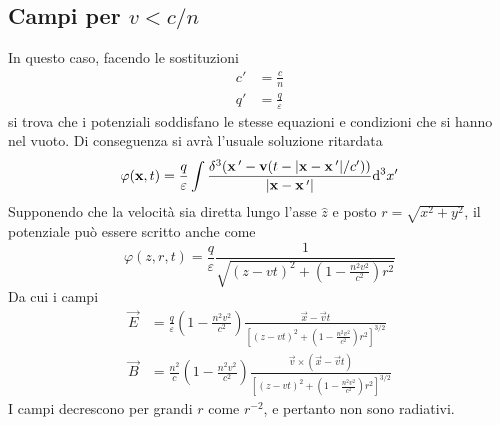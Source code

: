 \documentclass{article}
\begin{document}
	\subsection{Campi per $v<c/n$}
	In questo caso, facendo le sostituzioni
	\begin{align*}
		c'&=\frac{c}{n}\\q'&=\frac{q}{\varepsilon}
	\end{align*}
	si trova che i potenziali soddisfano le stesse equazioni e condizioni che si hanno nel vuoto. Di conseguenza si avrà l'usuale soluzione ritardata
	\[\varphi(\mathbf{x},t)=\frac{q}{\varepsilon}\int\frac{\delta^3(\mathbf{x}\,'-\mathbf{v}(t-|\mathbf{x}-\mathbf{x}\,'|/c'))}{|\mathbf{x}-\mathbf{x}\,'|}\mathrm{d} ^3x'\]
	Supponendo che la velocità sia diretta lungo l'asse $\hat{z}$ e posto $r=\sqrt{x^2+y^2}$, il potenziale può essere scritto anche come
	\[\varphi(z,r,t)=\frac{q}{\varepsilon}\frac{1}{\sqrt{(z-vt)^2+\left(1-\frac{n^2v^2}{c^2}\right)r^2}}\]
	Da cui i campi
	\begin{align*}
		\vec{E}&=\frac{q}{\varepsilon}\left(1-\frac{n^2v^2}{c^2}\right)\frac{\vec{x}-\vec{v}t}{\left[(z-vt)^2+\left(1-\frac{n^2v^2}{c^2}\right)r^2\right]^{3/2}}\\
		\vec{B}&=\frac{n^2}{c}\left(1-\frac{n^2v^2}{c^2}\right)\frac{\vec{v}\times(\vec{x}-\vec{v}t)}{\left[(z-vt)^2+\left(1-\frac{n^2v^2}{c^2}\right)r^2\right]^{3/2}}
	\end{align*}
	I campi decrescono per grandi $r$ come $r^{-2}$, e pertanto non sono radiativi.
\end{document}
